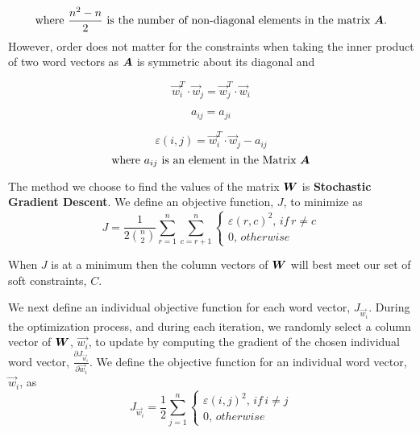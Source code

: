 \documentclass{article}
\begin{document}
\begin{equation*}
\text{where } \frac{n^2 - n}{2} \text{ is the number of non-diagonal elements in the matrix } \boldsymbol{A}.
\end{equation*}
However, order does not matter for the constraints when taking the inner product of two word vectors as $\boldsymbol{A}$ is symmetric about its diagonal and 

\begin{equation*}
\vec{w}_{i}^T \cdot \vec{w}_{j} = \vec{w}_{j}^T \cdot \vec{w}_{i}
\end{equation*}

\begin{equation*}
a_{ij} = a_{ji}
\end{equation*}


\begin{equation*}
\varepsilon(i,j) = \vec{w}_{i}^T \cdot \vec{w}_{j} - a_{ij}
\end{equation*}
\begin{equation*}
\text{where $a_{ij}$ is an element in the Matrix $\boldsymbol{A}$}
\end{equation*}

The method we choose to find the values of the matrix $\boldsymbol{W}$ is \textbf{Stochastic Gradient Descent}. We define an objective function, $J$, to minimize as
\begin{equation*}
J = \frac{1}{2 {n \choose 2} } \sum_{r=1}^{n}{\sum_{c=r+1}^{n}{
\begin{cases}
\varepsilon(r,c)^2, \, if \, r \neq c
\\
0, \, otherwise
\end{cases}
}}
\end{equation*}

When $J$ is at a minimum then the column vectors of $\boldsymbol{W}$ will best meet our set of soft constraints, $C$.

We next define an individual objective function for each word vector, $J_{\vec{w}_{i}}$. During the optimization process, and during each iteration, we randomly select a column vector of $\boldsymbol{W}$, $\vec{w_i}$, to update by computing the gradient of the chosen individual word vector, $\frac{\partial J_{\vec{w}_{i}}}{\partial \vec{w}_{i}}$. We define the objective function for an individual word vector, $\vec{w}_{i}$,  as
\begin{equation*}
J_{\vec{w}_{i}} = \frac{1}{2} \sum_{j=1}^{n} {\begin{cases}
\varepsilon(i,j)^2, \, if \, i \neq j
\\
0, \, otherwise
\end{cases}}
\end{equation*}
\end{document}
